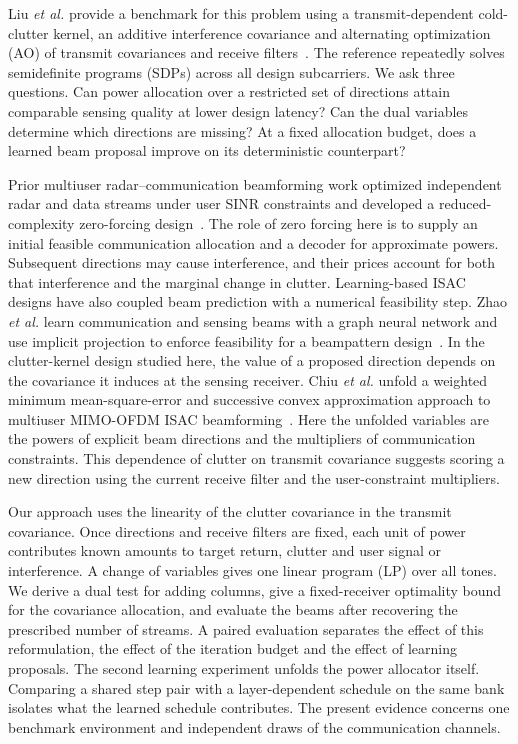 \documentclass[journal]{IEEEtran}
\begin{document}
Liu \emph{et al.} provide a benchmark for this problem using a transmit-dependent cold-clutter kernel, an additive interference covariance and alternating optimization (AO) of transmit covariances and receive filters~\cite{liu2026clutter,liuCode}. The reference repeatedly solves semidefinite programs (SDPs) across all design subcarriers. We ask three questions. Can power allocation over a restricted set of directions attain comparable sensing quality at lower design latency? Can the dual variables determine which directions are missing? At a fixed allocation budget, does a learned beam proposal improve on its deterministic counterpart?

Prior multiuser radar--communication beamforming work optimized independent radar and data streams under user SINR constraints and developed a reduced-complexity zero-forcing design~\cite{xiang2020}. The role of zero forcing here is to supply an initial feasible communication allocation and a decoder for approximate powers. Subsequent directions may cause interference, and their prices account for both that interference and the marginal change in clutter.
Learning-based ISAC designs have also coupled beam prediction with a numerical feasibility step. Zhao \emph{et al.} learn communication and sensing beams with a graph neural network and use implicit projection to enforce feasibility for a beampattern design~\cite{zhao}. In the clutter-kernel design studied here, the value of a proposed direction depends on the covariance it induces at the sensing receiver. Chiu \emph{et al.} unfold a weighted minimum mean-square-error and successive convex approximation approach to multiuser MIMO-OFDM ISAC beamforming~\cite{chiu2025mimoofdm}. Here the unfolded variables are the powers of explicit beam directions and the multipliers of communication constraints. This dependence of clutter on transmit covariance suggests scoring a new direction using the current receive filter and the user-constraint multipliers.

Our approach uses the linearity of the clutter covariance in the transmit covariance. Once directions and receive filters are fixed, each unit of power contributes known amounts to target return, clutter and user signal or interference. A change of variables gives one linear program (LP) over all tones. We derive a dual test for adding columns, give a fixed-receiver optimality bound for the covariance allocation, and evaluate the beams after recovering the prescribed number of streams. A paired evaluation separates the effect of this reformulation, the effect of the iteration budget and the effect of learning proposals. The second learning experiment unfolds the power allocator itself. Comparing a shared step pair with a layer-dependent schedule on the same bank isolates what the learned schedule contributes. The present evidence concerns one benchmark environment and independent draws of the communication channels.
\end{document}
